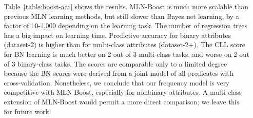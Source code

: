 \documentclass{article}
\begin{document}
Table~\ref{table:boost-acc} shows the results.  MLN-Boost is much more scalable than previous MLN learning methods, %
but still slower than Bayes net learning, by a factor of 10-1,000 depending on the learning task. The number of regression trees has a big impact on learning time. Predictive accuracy for binary attributes (dataset-2) is higher than for multi-class attributes (dataset-2+). The CLL score for BN learning is much better on 2 out of 3 multi-class tasks, and worse on 2 out of 3 binary-class tasks. The scores are comparable only to a limited degree because the BN scores were derived from a joint model of all predicates with cross-validation. Nonetheless, we conclude that our frequency model is very competitive with MLN-Boost, especially for nonbinary attributes.
A multi-class extension of MLN-Boost would permit a more direct comparison; we leave this for future work.
 
 \begin{table}[htdp]
\caption{Performance Metrics for MLN-Boost. NT = inference did not terminate.}
\begin{center}
\end{center}
\label{table:boost-acc}
\end{table}%
\end{document}
